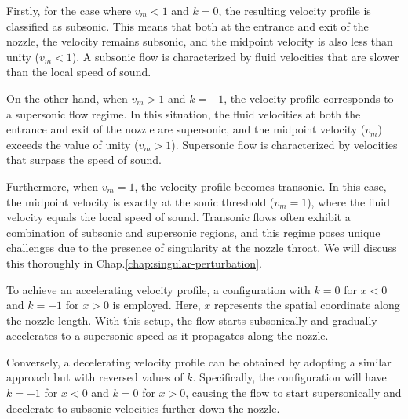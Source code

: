 Firstly, for the case where $v_m < 1$ and $k = 0$, the resulting velocity profile is classified as subsonic. This means that both at the entrance and exit of the nozzle, the velocity remains subsonic, and the midpoint velocity is also less than unity ($v_m < 1$). A subsonic flow is characterized by fluid velocities that are slower than the local speed of sound.

On the other hand, when $v_m > 1$ and $k = -1$, the velocity profile corresponds to a supersonic flow regime. In this situation, the fluid velocities at both the entrance and exit of the nozzle are supersonic, and the midpoint velocity ($v_m$) exceeds the value of unity ($v_m > 1$). Supersonic flow is characterized by velocities that surpass the speed of sound.

Furthermore, when $v_m = 1$, the velocity profile becomes transonic. In this case, the midpoint velocity is exactly at the sonic threshold ($v_m = 1$), where the fluid velocity equals the local speed of sound. Transonic flows often exhibit a combination of subsonic and supersonic regions, and this regime poses unique challenges due to the presence of singularity at the nozzle throat. We will discuss this thoroughly in Chap.\ref{chap:singular-perturbation}.

To achieve an accelerating velocity profile, a configuration with $k = 0$ for $x < 0$ and $k = -1$ for $x > 0$ is employed. Here, $x$ represents the spatial coordinate along the nozzle length. With this setup, the flow starts subsonically and gradually accelerates to a supersonic speed as it propagates along the nozzle.

Conversely, a decelerating velocity profile can be obtained by adopting a similar approach but with reversed values of $k$. Specifically, the configuration will have $k = -1$ for $x < 0$ and $k = 0$ for $x > 0$, causing the flow to start supersonically and decelerate to subsonic velocities further down the nozzle.

